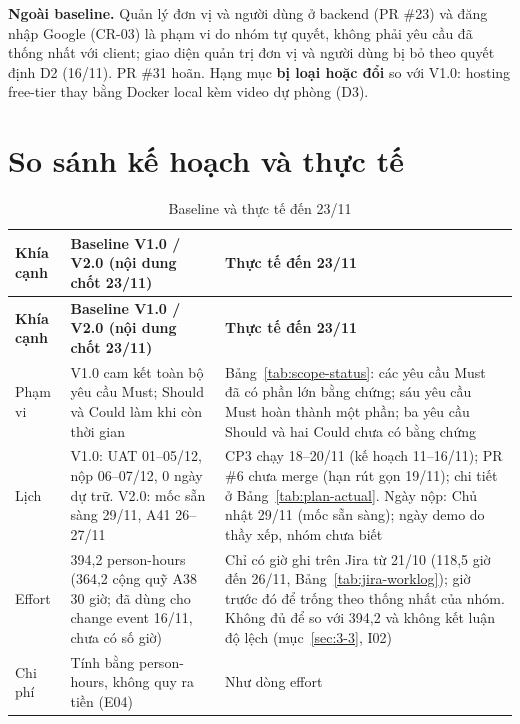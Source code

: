 \textbf{Ngoài baseline.} Quản lý đơn vị và người dùng ở backend (PR \#23) và đăng nhập Google (CR-03) là phạm vi do nhóm tự quyết, không phải yêu cầu đã thống nhất với client; giao diện quản trị đơn vị và người dùng bị bỏ theo quyết định D2 (16/11). PR \#31 hoãn. Hạng mục \textbf{bị loại hoặc đổi} so với V1.0: hosting free-tier thay bằng Docker local kèm video dự phòng (D3).


\section{So sánh kế hoạch và thực tế}
\label{sec:4-2}

\begingroup\tblsetup\tblzebra
\begin{longtable}{L{2.2cm}L{4.4cm}L{6.4cm}}
\caption{Baseline và thực tế đến 23/11}\label{tab:baseline-vs-actual}\\
\toprule
{}\textbf{Khía cạnh} & \textbf{Baseline V1.0 / V2.0 (nội dung chốt 23/11)} & \textbf{Thực tế đến 23/11} \\
\midrule
\endfirsthead
\toprule
{}\textbf{Khía cạnh} & \textbf{Baseline V1.0 / V2.0 (nội dung chốt 23/11)} & \textbf{Thực tế đến 23/11} \\
\midrule
\endhead
\bottomrule
\endlastfoot
Phạm vi & V1.0 cam kết toàn bộ yêu cầu Must; Should và Could làm khi còn thời gian & Bảng~\ref{tab:scope-status}: các yêu cầu Must đã có phần lớn bằng chứng; sáu yêu cầu Must hoàn thành một phần; ba yêu cầu Should và hai Could chưa có bằng chứng \\
Lịch & V1.0: UAT 01--05/12, nộp 06--07/12, 0 ngày dự trữ. V2.0: mốc sẵn sàng 29/11, A41 26--27/11 & CP3 chạy 18--20/11 (kế hoạch 11--16/11); PR \#6 chưa merge (hạn rút gọn 19/11); chi tiết ở Bảng~\ref{tab:plan-actual}. Ngày nộp: Chủ nhật 29/11 (mốc sẵn sàng); ngày demo do thầy xếp, nhóm chưa biết \\
Effort & 394,2 person-hours (364,2 cộng quỹ A38 30 giờ; đã dùng cho change event 16/11, chưa có số giờ) & Chỉ có giờ ghi trên Jira từ 21/10 (118,5 giờ đến 26/11, Bảng~\ref{tab:jira-worklog}); giờ trước đó để trống theo thống nhất của nhóm. Không đủ để so với 394,2 và không kết luận độ lệch (mục~\ref{sec:3-3}, I02) \\
Chi phí & Tính bằng person-hours, không quy ra tiền (E04) & Như dòng effort \\
\end{longtable}
\endgroup

